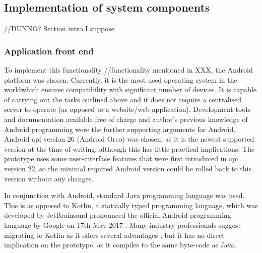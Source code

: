 \subsection{Implementation of system components}

//DUNNO? Section intro I suppose

\subsubsection{Application front end} 

To implement this functionality //functionality mentioned in XXX, the Android platform was chosen. Currently, it is the most used operating system in the world\footnotemark which ensures compatibility with significant number of devices. It is capable of carrying out the tasks outlined above and it does not require a centralised server to operate (as opposed to a website/web application). Development tools and documentation available free of charge and author's previous knowledge of Android programming were the further supporting arguments for Android. Android \acrshort{api} version 26 (Android Oreo) was chosen, as it is the newest supported version at the time of writing, although this has little practical implications. The prototype uses some user-interface features that were first introduced in \acrshort{api} version 22, so the minimal required Android version could be rolled back to this version without any changes.
% 

In conjunction with Android, standard Java programming language was used. This is as opposed to Kotlin, a statically typed programming language, which was developed by JetBrains\footnotemark and pronounced the official Android programming language by Google on 17th May 2017 \cite{Vasic2017MasteringKotlin}. 
% 
% 
Many industry professionals suggest migrating to Kotlin as it offers several advantages \cite{Vasic2017MasteringKotlin} \footnotemark, but it has no direct implication on the prototype, as it compiles to the same byte-code as Java.
% 

